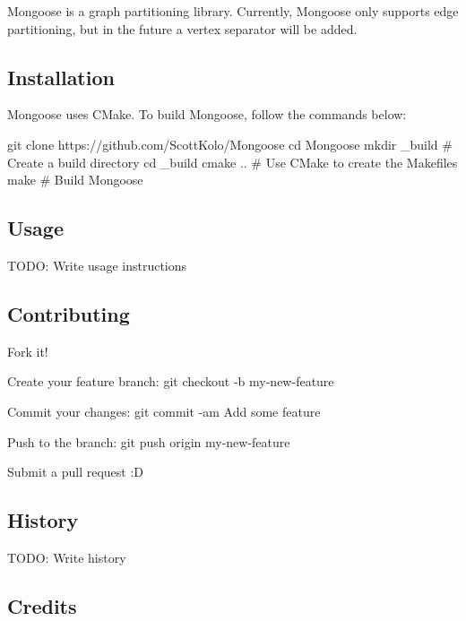 \href{https://travis-ci.com/ScottKolo/Mongoose}{\tt } \href{https://codecov.io/gh/ScottKolo/Mongoose}{\tt }

Mongoose is a graph partitioning library. Currently, Mongoose only supports edge partitioning, but in the future a vertex separator will be added.

\subsection*{Installation}

Mongoose uses C\+Make. To build Mongoose, follow the commands below\+:


\begin{DoxyCode}
git clone https://github.com/ScottKolo/Mongoose
cd Mongoose
mkdir \_build # Create a build directory
cd \_build 
cmake ..     # Use CMake to create the Makefiles
make         # Build Mongoose
\end{DoxyCode}


\subsection*{Usage}

T\+O\+DO\+: Write usage instructions

\subsection*{Contributing}


\begin{DoxyEnumerate}
\item Fork it!
\item Create your feature branch\+: {\ttfamily git checkout -\/b my-\/new-\/feature}
\item Commit your changes\+: {\ttfamily git commit -\/am \textquotesingle{}Add some feature\textquotesingle{}}
\item Push to the branch\+: {\ttfamily git push origin my-\/new-\/feature}
\item Submit a pull request \+:D
\end{DoxyEnumerate}

\subsection*{History}

T\+O\+DO\+: Write history

\subsection*{Credits}

